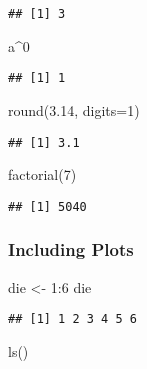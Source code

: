 \documentclass[
]{article}
\newenvironment{Shaded}{\begin{snugshade}}{\end{snugshade}}
\newcommand{\AttributeTok}[1]{\textcolor[rgb]{0.77,0.63,0.00}{#1}}
\newcommand{\DecValTok}[1]{\textcolor[rgb]{0.00,0.00,0.81}{#1}}
\newcommand{\FloatTok}[1]{\textcolor[rgb]{0.00,0.00,0.81}{#1}}
\newcommand{\FunctionTok}[1]{\textcolor[rgb]{0.00,0.00,0.00}{#1}}
\newcommand{\NormalTok}[1]{#1}
\newcommand{\OtherTok}[1]{\textcolor[rgb]{0.56,0.35,0.01}{#1}}
\newcommand{\SpecialCharTok}[1]{\textcolor[rgb]{0.00,0.00,0.00}{#1}}
\begin{document}
\begin{verbatim}
## [1] 3
\end{verbatim}

\begin{Shaded}
\begin{Highlighting}[]
\NormalTok{a}\SpecialCharTok{\^{}}\DecValTok{0}
\end{Highlighting}
\end{Shaded}

\begin{verbatim}
## [1] 1
\end{verbatim}

\begin{Shaded}
\begin{Highlighting}[]
\FunctionTok{round}\NormalTok{(}\FloatTok{3.14}\NormalTok{, }\AttributeTok{digits=}\DecValTok{1}\NormalTok{)}
\end{Highlighting}
\end{Shaded}

\begin{verbatim}
## [1] 3.1
\end{verbatim}

\begin{Shaded}
\begin{Highlighting}[]
\FunctionTok{factorial}\NormalTok{(}\DecValTok{7}\NormalTok{)}
\end{Highlighting}
\end{Shaded}

\begin{verbatim}
## [1] 5040
\end{verbatim}

\hypertarget{including-plots}{%
\subsubsection{Including Plots}\label{including-plots}}

\begin{Shaded}
\begin{Highlighting}[]
\NormalTok{die }\OtherTok{\textless{}{-}} \DecValTok{1}\SpecialCharTok{:}\DecValTok{6}
\NormalTok{die}
\end{Highlighting}
\end{Shaded}

\begin{verbatim}
## [1] 1 2 3 4 5 6
\end{verbatim}

\begin{Shaded}
\begin{Highlighting}[]
\FunctionTok{ls}\NormalTok{()}
\end{Highlighting}
\end{Shaded}
\end{document}
